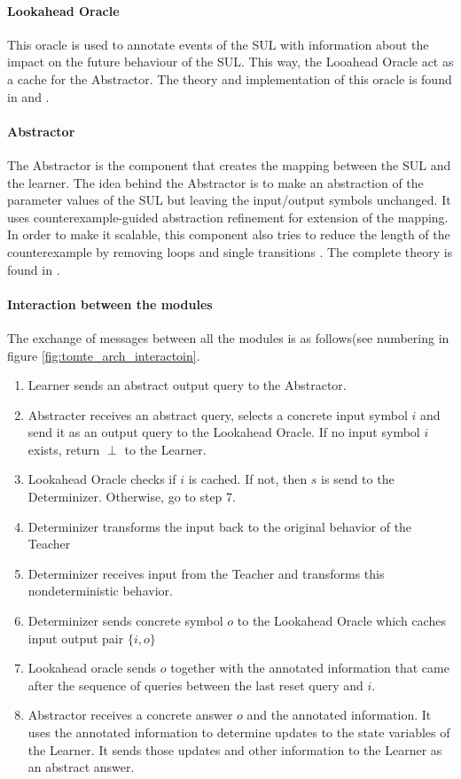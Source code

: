 \documentclass[multi,crop=false,class=article]{standalone}
\begin{document}
\paragraph{Lookahead Oracle}
This oracle is used to annotate events of the SUL with information about the 
impact on the future behaviour of the SUL. This way, the Looahead Oracle act as 
a cache for the Abstractor. The theory and implementation of 
this oracle is found in \cite{Aarts2014} and \cite{tomte14}.

\paragraph{Abstractor}
The Abstractor is the component that creates the mapping between the SUL and 
the learner. The idea behind the Abstractor is to make an abstraction of the 
parameter values of the SUL but leaving the input/output symbols unchanged. It 
uses counterexample-guided abstraction refinement\cite{tomte14} for extension 
of the mapping. In order to make it scalable, this component also tries to 
reduce the length of the counterexample by removing loops and single 
transitions \cite{Koopman2014}. The complete theory is found in \cite{tomte14}.

\paragraph{Interaction between the modules} The exchange of messages between 
all the modules is as follows(see numbering in figure 
\ref{fig:tomte_arch_interactoin}.
\begin{enumerate}
	\item Learner sends an abstract output query to the Abstractor.
	\item Abstracter receives an abstract query, selects a concrete input 
	symbol $i$ and send it as an output query to the Lookahead Oracle. If no 
	input symbol $i$ exists, return $\perp$ to the Learner.
	\item  Lookahead Oracle checks if $i$ is cached. If not, then $s$ is send 
	to the Determinizer. Otherwise, go to step 7.
	\item Determinizer transforms the input back to the original behavior of 
	the Teacher  
	\item Determinizer receives input from the Teacher and transforms this 
	nondeterministic behavior.
	\item Determinizer sends concrete symbol $o$ to the Lookahead Oracle which 
	caches input output pair $\{i,o\}$
	\item Lookahead oracle sends $o$ together with the annotated information 
	that came after the sequence of queries between the last reset query and 
	$i$.
	\item Abstractor receives a concrete answer $o$ and the annotated 
	information. It uses the annotated information to determine updates to the 
	state variables of the Learner. It sends those updates and other 
	information to the Learner as an abstract answer. 
\end{enumerate}
\end{document}
